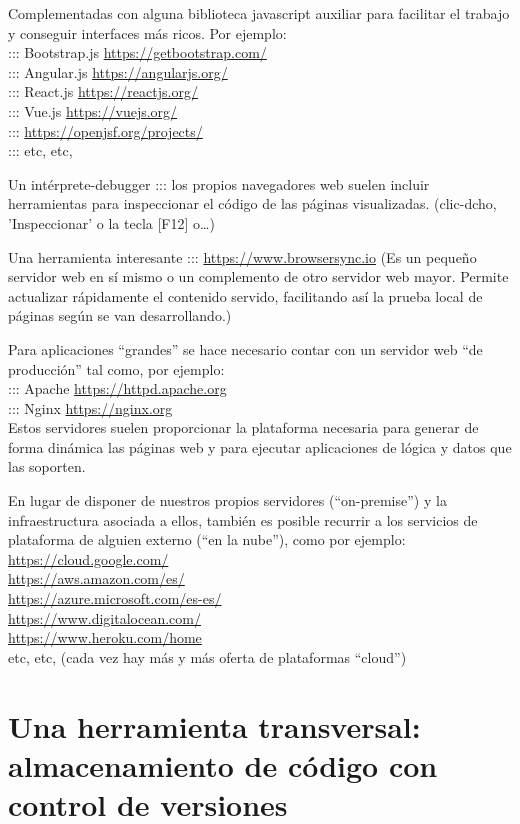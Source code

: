 \documentclass[spanish,12pt,a4paper,final,oneside]{book}
\begin{document}
Complementadas con alguna biblioteca javascript auxiliar para facilitar el trabajo y conseguir interfaces más ricos. Por ejemplo:
\\::: Bootstrap.js \url{https://getbootstrap.com/}
\\::: Angular.js \url{https://angularjs.org/}
\\::: React.js \url{https://reactjs.org/}
\\::: Vue.js \url{https://vuejs.org/}
\\::: \url{https://openjsf.org/projects/}
\\::: etc, etc,

Un intérprete-debugger ::: los propios navegadores web suelen incluir  herramientas para inspeccionar el código de las páginas visualizadas. (clic-dcho, 'Inspeccionar' o la tecla [F12] o\ldots)

Una herramienta interesante ::: \url{https://www.browsersync.io} (Es un pequeño servidor web en sí mismo o un complemento de otro servidor web mayor. Permite actualizar rápidamente el contenido servido, facilitando así la prueba local de páginas según se van desarrollando.)

Para aplicaciones ``grandes'' se hace necesario contar con un servidor web ``de producción'' tal como, por ejemplo:
\\::: Apache \url{https://httpd.apache.org}
\\::: Nginx \url{https://nginx.org} 
\\Estos servidores suelen proporcionar la plataforma necesaria para generar de forma dinámica las páginas web y para ejecutar aplicaciones de lógica y datos que las soporten. 


En lugar de disponer de nuestros propios servidores (``on-premise'') y la infraestructura asociada a ellos, también es posible recurrir a los servicios de plataforma de alguien externo (``en la nube''), como por ejemplo:
\\ \url{https://cloud.google.com/}
\\ \url{https://aws.amazon.com/es/}
\\ \url{https://azure.microsoft.com/es-es/}
\\ \url{https://www.digitalocean.com/}
\\ \url{https://www.heroku.com/home}
\\ etc, etc, (cada vez hay más y más oferta de plataformas ``cloud'')


\section{Una herramienta transversal: almacenamiento de código con control de versiones}
\end{document}
